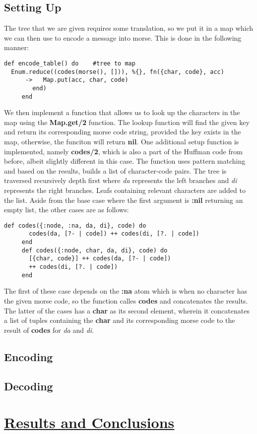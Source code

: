 \documentclass[a4paper,11pt]{article}
\begin{document}
\subsection*{
	\textbf{Setting Up}
	}
The tree that we are given requires some translation, so we put it in a map which we can then use to encode a message into morse. This is done in the following manner:
\begin{verbatim}
def encode_table() do    #tree to map
  Enum.reduce((codes(morse(), [])), %{}, fn({char, code}, acc)
      ->   Map.put(acc, char, code)
        end)
     end
\end{verbatim}
We then implement a function that allows us to look up the characters in the map using the \textbf{Map.get/2} function. The lookup function will find the given key and return its corresponding morse code string, provided the key exists in the map, otherwise, the funciton will return \textbf{nil}. One additional setup function is implemented, namely \textbf{codes/2}, which is also a part of the Huffman code from before, albeit slightly different in this case. The function uses pattern matching and based on the results, builds a list of character-code pairs. The tree is traversed recursively depth first where \textit{da} represents the left branches and \textit{di} represents the right branches. Leafs containing relevant characters are added to the list. Aside from the base case where the first argument is \textbf{:nil} returning an empty list, the other cases are as follows:
\begin{verbatim}
def codes({:node, :na, da, di}, code) do
       codes(da, [?- | code]) ++ codes(di, [?. | code])
     end
     def codes({:node, char, da, di}, code) do
       [{char, code}] ++ codes(da, [?- | code]) 
       ++ codes(di, [?. | code])
     end
\end{verbatim}
The first of these case depends on the \textbf{:na} atom which is when no character has the given morse code, so the function calles \textbf{codes} and concatenates the results. The latter of the cases has a \textbf{char} as its second element, wherein it concatenates a list of tuples containing the \textbf{char} and its corresponding morse code to the result of \textbf{codes} for \textit{da} and \textit{di}.

\subsection*{
	\textbf{Encoding}
	}
	
\subsection*{
	\textbf{Decoding}
	}
	
\section*{
	\underline{Results and Conclusions}
	}
	
	
	
	
	
	
\end{document}
